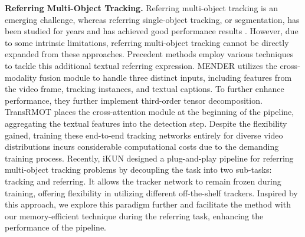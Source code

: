 {\bfseries Referring Multi-Object Tracking.}
Referring multi-object tracking is an emerging challenge, whereas referring single-object tracking, or segmentation, has been studied for years and has achieved good performance results \cite{ZHAO202310, zhou2023joint, zheng2023towards, wu2022language, botach2021end}. However, due to some intrinsic limitations, referring multi-object tracking cannot be directly expanded from these approaches. Precedent methods employ various techniques to tackle this additional textual referring expression. MENDER \cite{nguyen2023type} utilizes the cross-modality fusion module to handle three distinct inputs, including features from the video frame, tracking instances, and textual captions. To further enhance performance, they further implement third-order tensor decomposition. TransRMOT \cite{wu2023referring} places the cross-attention module at the beginning of the pipeline, aggregating the textual features into the detection step. Despite the flexibility gained, training these end-to-end tracking networks entirely for diverse video distributions incurs considerable computational costs due to the demanding training process. Recently, iKUN \cite{du2024ikun} designed a plug-and-play pipeline for referring multi-object tracking problems by decoupling the task into two sub-tasks: tracking and referring. It allows the tracker network to remain frozen during training, offering flexibility in utilizing different off-the-shelf trackers. Inspired by this approach, we explore this paradigm further and facilitate the method with our memory-efficient technique during the referring task, enhancing the performance of the pipeline.